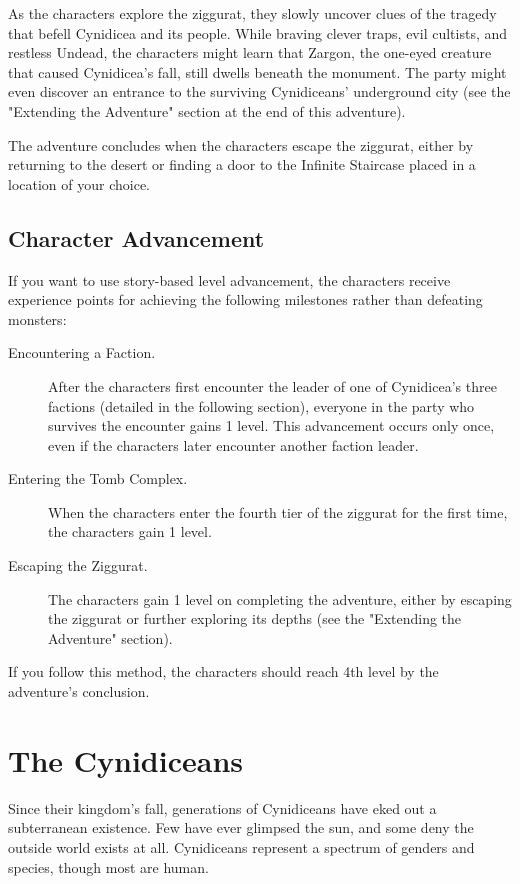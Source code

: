 \documentclass[10pt,a4paper,twoside,bg=print,twocolumn,openany,nodeprecatedcode]{dndbook}
\begin{document}
As the characters explore the ziggurat, they slowly uncover clues of the tragedy that befell Cynidicea and its people. While braving clever traps, evil cultists, and restless Undead, the characters might learn that Zargon, the one-eyed creature that caused Cynidicea's fall, still dwells beneath the monument. The party might even discover an entrance to the surviving Cynidiceans' underground city (see the "Extending the Adventure" section at the end of this adventure).

The adventure concludes when the characters escape the ziggurat, either by returning to the desert or finding a door to the Infinite Staircase placed in a location of your choice.

\subsection{Character Advancement}
If you want to use story-based level advancement, the characters receive experience points for achieving the following milestones rather than defeating monsters:


\begin{description}
\item[Encountering a Faction.]
After the characters first encounter the leader of one of Cynidicea's three factions (detailed in the following section), everyone in the party who survives the encounter gains 1 level. This advancement occurs only once, even if the characters later encounter another faction leader.
\item[Entering the Tomb Complex.]
When the characters enter the fourth tier of the ziggurat for the first time, the characters gain 1 level.
\item[Escaping the Ziggurat.]
The characters gain 1 level on completing the adventure, either by escaping the ziggurat or further exploring its depths (see the "Extending the Adventure" section).
\end{description}

If you follow this method, the characters should reach 4th level by the adventure's conclusion.

\section{The Cynidiceans}
Since their kingdom's fall, generations of Cynidiceans have eked out a subterranean existence. Few have ever glimpsed the sun, and some deny the outside world exists at all. Cynidiceans represent a spectrum of genders and species, though most are human.
\end{document}
